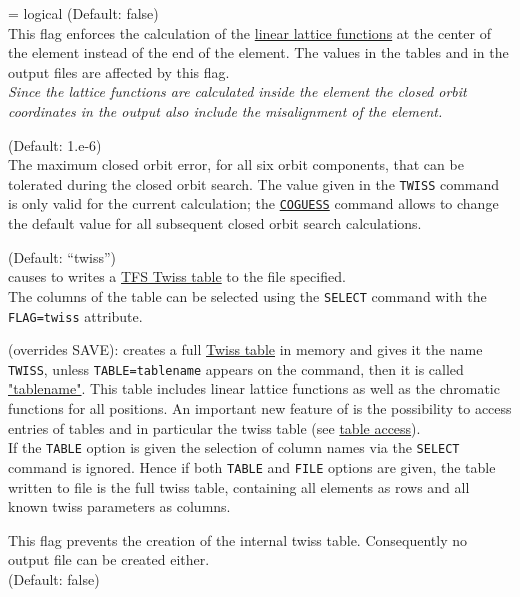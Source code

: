 \begin{madlist}
   = logical (Default: false) \\
  This flag enforces the calculation of the
  \href{../Introduction/tables.html#linear}{linear lattice
    functions} at the center of the element instead of the end
  of the element. The values in the tables and in the output files are
  affected by this flag. \\ 
  \textit{ Since the lattice functions are calculated inside the element
    the closed orbit coordinates in the output also include the misalignment
    of the element.}  

   (Default: 1.e-6) \\
  The maximum closed orbit error, for all six orbit components, 
  that can be tolerated during the closed orbit search. 
  The value given in the \texttt{TWISS} command is only valid for the current calculation; 
  the \href{../control/general.html#coguess}{\texttt{COGUESS}} command allows to 
  change the default value for all subsequent closed orbit search calculations. 

   (Default: ``twiss'') \\
  causes \madx to writes a  \href{../Introduction/select.html#tfs}{TFS Twiss table} 
  to the file specified. \\
  The columns of the table can be selected using the \texttt{SELECT}
  command with the \texttt{FLAG=twiss} attribute. 

   (overrides SAVE): \madx creates a full
  \href{../Introduction/tables.html#linear}{Twiss table} in
  memory and gives it the name \texttt{TWISS}, unless \texttt{TABLE=tablename}
  appears on the command, then it is called
  \href{../Introduction/label.html}{"tablename"}. This table
  includes linear lattice functions as well as the chromatic
  functions for all positions. An important new feature of \madx
  is the possibility to access entries of tables and in
  particular the twiss table (see
  \href{../Introduction/expression.html#table}{table access}).\\
  If the \texttt{TABLE} option is given the selection of column names via the
  \texttt{SELECT} command is ignored. Hence if both \texttt{TABLE} and
  \texttt{FILE} options are given, the table written to file is the full
  twiss table, containing all elements as rows and all known twiss 
  parameters as columns. 

   This flag prevents the creation of the internal twiss
  table. Consequently no output file can be created either.  \\ 
  (Default: false)
  


\end{madlist}
